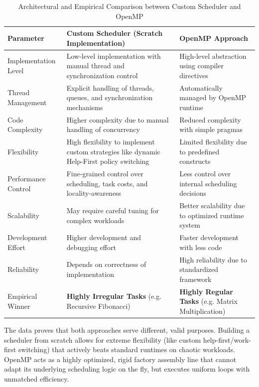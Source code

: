 \documentclass[12pt,a4paper]{article}
\begin{document}
\begin{table}[H]
\centering
\begin{tabular}{|p{4cm}|p{5cm}|p{5cm}|}
\hline
\textbf{Parameter} & \textbf{Custom Scheduler (Scratch Implementation)} & \textbf{OpenMP Approach} \\
\hline
Implementation Level & Low-level implementation with manual thread and synchronization control & High-level abstraction using compiler directives \\
\hline
Thread Management & Explicit handling of threads, queues, and synchronization mechanisms & Automatically managed by OpenMP runtime \\
\hline
Code Complexity & Higher complexity due to manual handling of concurrency & Reduced complexity with simple pragmas \\
\hline
Flexibility & High flexibility to implement custom strategies like dynamic Help-First policy switching & Limited flexibility due to predefined constructs \\
\hline
Performance Control & Fine-grained control over scheduling, task costs, and locality-awareness & Less control over internal scheduling decisions \\
\hline
Scalability & May require careful tuning for complex workloads & Better scalability due to optimized runtime system \\
\hline
Development Effort & Higher development and debugging effort & Faster development with less code \\
\hline
Reliability & Depends on correctness of implementation & High reliability due to standardized framework \\
\hline
Empirical Winner & \textbf{Highly Irregular Tasks} (e.g. Recursive Fibonacci) & \textbf{Highly Regular Tasks} (e.g. Matrix Multiplication) \\
\hline
\end{tabular}
\caption{Architectural and Empirical Comparison between Custom Scheduler and OpenMP}
\label{tab:comparison}
\end{table}

The data proves that both approaches serve different, valid purposes. Building a scheduler from scratch allows for extreme flexibility (like custom help-first/work-first switching) that actively beats standard runtimes on chaotic workloads. OpenMP acts as a highly optimized, rigid factory assembly line that cannot adapt its underlying scheduling logic on the fly, but executes uniform loops with unmatched efficiency.
\end{document}
